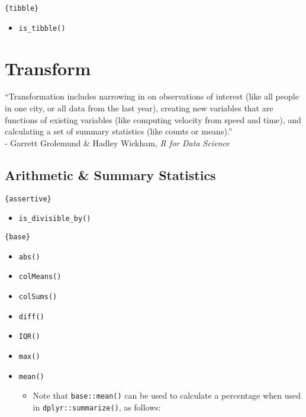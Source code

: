 \documentclass[
]{book}
\providecommand{\tightlist}{%
  \setlength{\itemsep}{0pt}\setlength{\parskip}{0pt}}
\begin{document}
\texttt{\{tibble\}}

\begin{itemize}
\tightlist
\item
  \texttt{is\_tibble()}
\end{itemize}

\hypertarget{transform}{%
\chapter{Transform}\label{transform}}

``Transformation includes narrowing in on observations of interest (like all people in one city, or all data from the last year), creating new variables that are functions of existing variables (like computing velocity from speed and time), and calculating a set of summary statistics (like counts or means).''\\
- Garrett Grolemund \& Hadley Wickham, \emph{R for Data Science}

\hypertarget{arithmetic-summary-statistics}{%
\section{Arithmetic \& Summary Statistics}\label{arithmetic-summary-statistics}}

\texttt{\{assertive\}}

\begin{itemize}
\tightlist
\item
  \texttt{is\_divisible\_by()}
\end{itemize}

\texttt{\{base\}}

\begin{itemize}
\tightlist
\item
  \texttt{abs()}
\item
  \texttt{colMeans()}
\item
  \texttt{colSums()}
\item
  \texttt{diff()}
\item
  \texttt{IQR()}
\item
  \texttt{max()}
\item
  \texttt{mean()}

  \begin{itemize}
  \tightlist
  \item
    Note that \texttt{base::mean()} can be used to calculate a percentage when used in \texttt{dplyr::summarize()}, as follows:
  \end{itemize}
\end{itemize}
\end{document}
